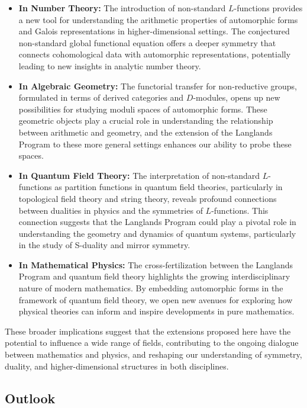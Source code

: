 \documentclass{article}
\theoremstyle{remark}
\begin{document}
\begin{itemize}
    \item \textbf{In Number Theory:} The introduction of non-standard $L$-functions provides a new tool for understanding the arithmetic properties of automorphic forms and Galois representations in higher-dimensional settings. The conjectured non-standard global functional equation offers a deeper symmetry that connects cohomological data with automorphic representations, potentially leading to new insights in analytic number theory.
    \item \textbf{In Algebraic Geometry:} The functorial transfer for non-reductive groups, formulated in terms of derived categories and $D$-modules, opens up new possibilities for studying moduli spaces of automorphic forms. These geometric objects play a crucial role in understanding the relationship between arithmetic and geometry, and the extension of the Langlands Program to these more general settings enhances our ability to probe these spaces.
    \item \textbf{In Quantum Field Theory:} The interpretation of non-standard $L$-functions as partition functions in quantum field theories, particularly in topological field theory and string theory, reveals profound connections between dualities in physics and the symmetries of $L$-functions. This connection suggests that the Langlands Program could play a pivotal role in understanding the geometry and dynamics of quantum systems, particularly in the study of S-duality and mirror symmetry.
    \item \textbf{In Mathematical Physics:} The cross-fertilization between the Langlands Program and quantum field theory highlights the growing interdisciplinary nature of modern mathematics. By embedding automorphic forms in the framework of quantum field theory, we open new avenues for exploring how physical theories can inform and inspire developments in pure mathematics.
\end{itemize}

These broader implications suggest that the extensions proposed here have the potential to influence a wide range of fields, contributing to the ongoing dialogue between mathematics and physics, and reshaping our understanding of symmetry, duality, and higher-dimensional structures in both disciplines.

\subsection{Outlook}
\end{document}
